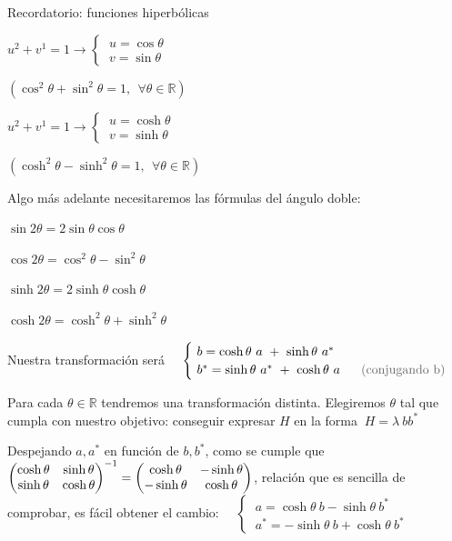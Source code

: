 \begin{myalertblock}{Recordatorio: funciones hiperbólicas}
\begin{center}
\begin{multicols}{2}
$u^2+v^1=1 \to 	\begin{cases} \ u= \cos \theta \\ \ v=\sin \theta \end{cases} $

$(\cos^2 \theta + \sin^2 \theta=1,\ \ \forall \theta \in \mathbb R) $

$u^2+v^1=1 \to 	\begin{cases} \ u= \cosh \theta \\ \ v=\sinh \theta \end{cases} $

$(\cosh^2 \theta -\sinh^2 \theta=1,\ \ \forall \theta \in \mathbb R) $
\end{multicols}

\vspace{5mm}Algo más adelante necesitaremos las fórmulas del ángulo doble:

\begin{multicols}{2}

$\sin 2 \theta=2\sin \theta \cos \theta$

$\cos 2 \theta=\cos^2 \theta	 - \sin^2 \theta$

$\sinh 2 \theta=2 \sinh \theta \cosh \theta$

$\cosh 2 \theta= \cosh^2 \theta + \sinh^2 \theta$
\end{multicols}
\end{center}
\end{myalertblock}

\vspace{5mm} Nuestra transformación será $\quad \begin{cases}
\ b=\cosh \theta \ a \ + \ \sinh \theta \ a^* \\ \ b^*=\sinh \theta \ a^* \ + \ \cosh \theta \ a 	& \ \ \textcolor{gris}{\text{(conjugando  b)}}
 \end{cases}$

Para cada $\theta \in \mathbb R$ tendremos una transformación distinta. Elegiremos $\theta$  tal que cumpla con nuestro objetivo: conseguir expresar $H$ en la forma $\ H=\lambda \ bb^*$


Despejando $a,a^*$ en función de $b,b^*$, como se cumple que $\mqty(\cosh \theta & \sinh \theta \\ \sinh \theta & \cosh \theta ) ^{-1}=\mqty(\cosh \theta & -\sinh \theta \\ -\sinh \theta & \cosh \theta)$, relación que es sencilla de comprobar, es fácil obtener el cambio:
$\quad \begin{cases} \ a=\cosh \theta \ b - \sinh \theta \ b^* \\ \ a^*=-\sinh \theta \ b + \cosh \theta \ b^*  \end{cases}$ 

